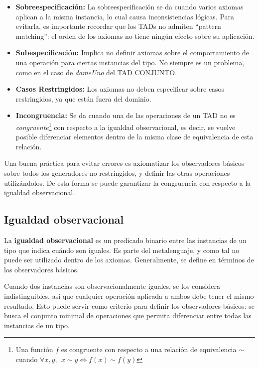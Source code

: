 \documentclass{article}
\begin{document}
\begin{itemize}
    \item \textbf{Sobreespecificación:} La sobreespecificación se da cuando varios axiomas aplican a la misma instancia, lo cual causa inconsistencias lógicas. Para evitarla, es importante recordar que los TADs no admiten ``pattern matching'': el orden de los axiomas no tiene ningún efecto sobre su aplicación.
    \item \textbf{Subespecificación:} Implica no definir axiomas sobre el comportamiento de una operación para ciertas instancias del tipo. No siempre es un problema, como en el caso de \textit{dameUno} del TAD \textsc{CONJUNTO}.
    \item \textbf{Casos Restringidos:} Los axiomas no deben especificar sobre casos restringidos, ya que están fuera del dominio.
    \item \textbf{Incongruencia:} Se da cuando una de las operaciones de un TAD no es \textit{congruente}\footnote{Una función $f$ es congruente con respecto a una relación de equivalencia $\sim$ cuando $\forall x, y,\ \ x \sim y \Longleftrightarrow f(x) \sim f(y) $} con respecto a la igualdad observacional, es decir, se vuelve posible diferenciar elementos dentro de la misma clase de equivalencia de esta relación.
\end{itemize}

Una buena práctica para evitar errores es axiomatizar los observadores básicos sobre todos los generadores no restringidos, y definir las otras operaciones utilizándolos. De esta forma se puede garantizar la congruencia con respecto a la igualdad observacional.

\subsection{Igualdad observacional}

La \textbf{igualdad observacional} es un predicado binario entre las instancias de un tipo que indica cuándo son iguales. Es parte del metalenguaje, y como tal no puede ser utilizado dentro de los axiomas. Generalmente, se define en términos de los observadores básicos.

Cuando dos instancias son observacionalmente iguales, se los considera indistinguibles, así que cualquier operación aplicada a ambos debe tener el mismo resultado. Esto puede servir como criterio para definir los observadores básicos: se busca el conjunto minimal de operaciones que permita diferenciar entre todas las instancias de un tipo.
\end{document}
